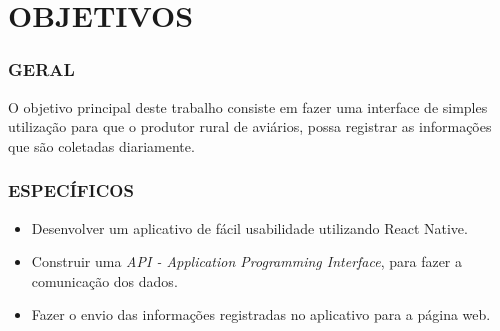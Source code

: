 
\chapter{OBJETIVOS}
\label{chap:objetivos}

\subsection{GERAL}
\label{subsec:objgeral}
O objetivo principal deste trabalho consiste em fazer uma interface de simples utilização para que o produtor rural de aviários, possa registrar as informações que são coletadas diariamente.



\subsection{ESPECÍFICOS}
\label{subsec:objesp}

\begin{itemize}
   \item Desenvolver um aplicativo de fácil usabilidade utilizando React Native.
   \item Construir uma \textit{API - Application Programming Interface}, para fazer a comunicação dos dados.
   \item Fazer o envio das informações registradas no aplicativo para a página web.
 \end{itemize}






